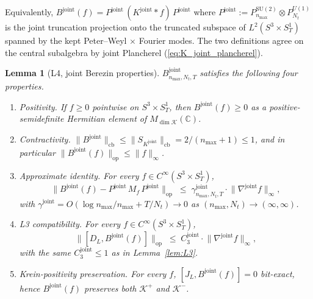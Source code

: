 \documentclass[11pt,a4paper]{article}
\theoremstyle{plain}
\newtheorem{lemma}[theorem]{Lemma}
\theoremstyle{definition}
\newcommand{\nmax}{n_{\max}}
\newcommand{\Nt}{N_{t}}
\newcommand{\Manifold}{S^{3}\times S^{1}_{T}}
\newcommand{\Krein}{\mathcal{K}}
\newcommand{\opnorm}[1]{\lVert #1 \rVert_{\mathrm{op}}}
\newcommand{\cbnorm}[1]{\lVert #1 \rVert_{\mathrm{cb}}}
\newcommand{\norm}[1]{\lVert #1 \rVert}
\newcommand{\C}{\mathbb{C}}
\newcommand{\SU}{\mathrm{SU}}
\newcommand{\Uone}{U(1)}
\newcommand{\Mat}{M}
\newcommand{\DL}{D_{L}}
\newcommand{\JL}{J_{L}}
\newcommand{\Bjoint}{B^{\mathrm{joint}}}
\newcommand{\Pjoint}{P^{\mathrm{joint}}}
\newcommand{\Kjoint}{K^{\mathrm{joint}}}
\newcommand{\gammajoint}{\gamma^{\mathrm{joint}}}
\newcommand{\Cthreejoint}{C_{3}^{\mathrm{joint}}}
\newcommand{\Kplus}{\Krein^{+}}
\newcommand{\Kminus}{\Krein^{-}}
\begin{document}
Equivalently, $\Bjoint(f) = \Pjoint\,(\Kjoint \ast f)\,\Pjoint$ where
$\Pjoint := P^{\SU(2)}_{\nmax} \otimes P^{\Uone}_{\Nt}$ is the joint
truncation projection onto the truncated subspace of
$L^{2}(\Manifold)$ spanned by the kept Peter--Weyl $\times$ Fourier
modes. The two definitions agree on the central subalgebra by joint
Plancherel (\ref{eq:K_joint_plancherel}).

\begin{lemma}[L4, joint Berezin properties]\label{lem:L4}
$\Bjoint_{\nmax,\Nt,T}$ satisfies the following four properties.
\begin{enumerate}
\item[(a)] \emph{Positivity.} If $f \ge 0$ pointwise on
$\Manifold$, then $\Bjoint(f) \ge 0$ as a positive-semidefinite
Hermitian element of $\Mat_{\dim\Krein}(\C)$.
\item[(b)] \emph{Contractivity.} $\cbnorm{\Bjoint} \le \cbnorm{S_{\Kjoint}}
= 2/(\nmax + 1) \le 1$, and in particular $\opnorm{\Bjoint(f)} \le
\norm{f}_{\infty}$.
\item[(c)] \emph{Approximate identity.} For every $f \in C^{\infty}(\Manifold)$,
\begin{equation}\label{eq:L4_approx_id}
   \opnorm{\Bjoint(f) - \Pjoint\,M_{f}\,\Pjoint}
   \;\le\; \gammajoint_{\nmax,\Nt,T} \cdot
            \norm{\nabla^{\mathrm{joint}} f}_{\infty},
\end{equation}
with $\gammajoint = O(\log\nmax/\nmax + T/\Nt) \to 0$ as
$(\nmax, \Nt) \to (\infty, \infty)$.
\item[(d)] \emph{L3 compatibility.} For every $f \in C^{\infty}(\Manifold)$,
\begin{equation}\label{eq:L4_L3compat}
   \opnorm{[\DL, \Bjoint(f)]}
   \;\le\; \Cthreejoint \cdot \norm{\nabla^{\mathrm{joint}} f}_{\infty},
\end{equation}
with the same $\Cthreejoint \le 1$ as in Lemma~\ref{lem:L3}.
\item[(e)] \emph{Krein-positivity preservation.} For every $f$,
$[\JL, \Bjoint(f)] = 0$ bit-exact, hence
$\Bjoint(f)$ preserves both $\Kplus$ and $\Kminus$.
\end{enumerate}
\end{lemma}
\end{document}
